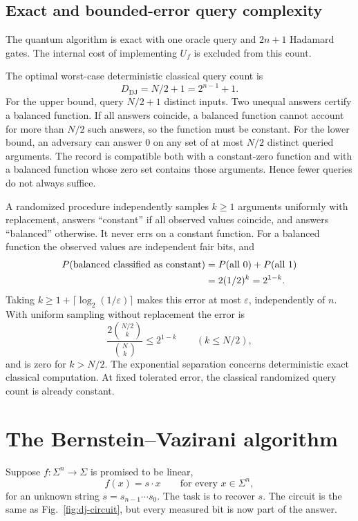 \documentclass[11pt,oneside,openany]{book}
\theoremstyle{definition}
\begin{document}
\subsection{Exact and bounded-error query complexity}
The quantum algorithm is exact with one oracle query and $2n+1$ Hadamard gates. The internal cost of implementing $U_f$ is excluded from this count.

The optimal worst-case deterministic classical query count is
\begin{equation}
 D_{\mathrm{DJ}}=N/2+1=2^{n-1}+1.
 \label{eq:dj-classical-exact}
\end{equation}
For the upper bound, query $N/2+1$ distinct inputs. Two unequal answers certify a balanced function. If all answers coincide, a balanced function cannot account for more than $N/2$ such answers, so the function must be constant. For the lower bound, an adversary can answer $0$ on any set of at most $N/2$ distinct queried arguments. The record is compatible both with a constant-zero function and with a balanced function whose zero set contains those arguments. Hence fewer queries do not always suffice.

A randomized procedure independently samples $k\ge1$ arguments uniformly with replacement, answers ``constant'' if all observed values coincide, and answers ``balanced'' otherwise. It never errs on a constant function. For a balanced function the observed values are independent fair bits, and
\begin{align}
 P(\text{balanced classified as constant})
 &=P(\text{all }0)+P(\text{all }1)\notag\\
 &=2(1/2)^k=2^{1-k}.
 \label{eq:dj-random-error}
\end{align}
Taking $k\ge1+\lceil\log_2(1/\varepsilon)\rceil$ makes this error at most $\varepsilon$, independently of $n$. With uniform sampling without replacement the error is
\begin{equation}
 \frac{2\binom{N/2}{k}}{\binom Nk}\le2^{1-k}\qquad(k\le N/2),
\end{equation}
and is zero for $k>N/2$. The exponential separation concerns deterministic exact classical computation. At fixed tolerated error, the classical randomized query count is already constant.

\section{The Bernstein--Vazirani algorithm}
\label{sec:bv}
Suppose $f:\Sigma^n\to\Sigma$ is promised to be linear,
\begin{equation}
 f(x)=s\cdot x\qquad\text{for every }x\in\Sigma^n,
 \label{eq:bv-promise}
\end{equation}
for an unknown string $s=s_{n-1}\cdots s_0$. The task is to recover $s$. The circuit is the same as Fig.~\ref{fig:dj-circuit}, but every measured bit is now part of the answer.
\end{document}
